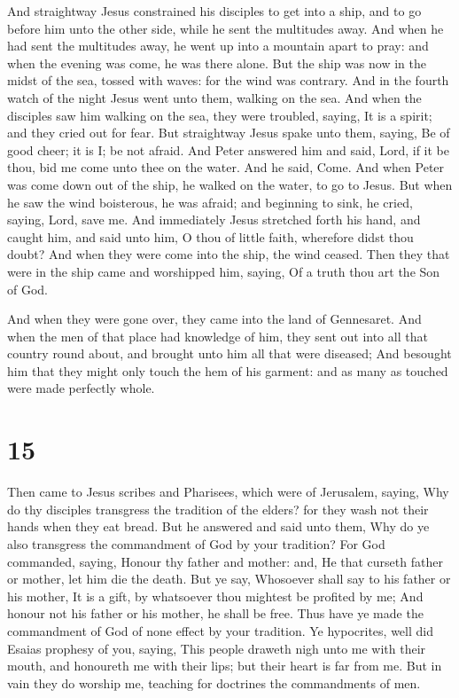  And straightway Jesus constrained his disciples to get
into a ship, and to go before him unto the other side, while he sent the
multitudes away.  And when he had sent the multitudes away,
he went up into a mountain apart to pray: and when the evening was come,
he was there alone.  But the ship was now in the midst of
the sea, tossed with waves: for the wind was contrary.  And
in the fourth watch of the night Jesus went unto them, walking on the
sea.  And when the disciples saw him walking on the sea,
they were troubled, saying, It is a spirit; and they cried out for fear.
 But straightway Jesus spake unto them, saying, Be of good
cheer; it is I; be not afraid.  And Peter answered him and
said, Lord, if it be thou, bid me come unto thee on the water.
 And he said, Come. And when Peter was come down out of the
ship, he walked on the water, to go to Jesus.  But when he
saw the wind boisterous, he was afraid; and beginning to sink, he cried,
saying, Lord, save me.  And immediately Jesus stretched
forth his hand, and caught him, and said unto him, O thou of little
faith, wherefore didst thou doubt?  And when they were come
into the ship, the wind ceased.  Then they that were in the
ship came and worshipped him, saying, Of a truth thou art the Son of
God.

 And when they were gone over, they came into the land of
Gennesaret.  And when the men of that place had knowledge
of him, they sent out into all that country round about, and brought
unto him all that were diseased;  And besought him that
they might only touch the hem of his garment: and as many as touched
were made perfectly whole.

\hypertarget{section-14}{%
\section{15}\label{section-14}}

 Then came to Jesus scribes and Pharisees, which were of
Jerusalem, saying,  Why do thy disciples transgress the
tradition of the elders? for they wash not their hands when they eat
bread.  But he answered and said unto them, Why do ye also
transgress the commandment of God by your tradition?  For
God commanded, saying, Honour thy father and mother: and, He that
curseth father or mother, let him die the death.  But ye
say, Whosoever shall say to his father or his mother, It is a gift, by
whatsoever thou mightest be profited by me;  And honour not
his father or his mother, he shall be free. Thus have ye made the
commandment of God of none effect by your tradition.  Ye
hypocrites, well did Esaias prophesy of you, saying,  This
people draweth nigh unto me with their mouth, and honoureth me with
their lips; but their heart is far from me.  But in vain
they do worship me, teaching for doctrines the commandments of men.

